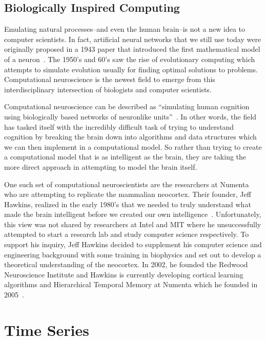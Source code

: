 \documentclass[oneside,12pt,openany]{book}
\begin{document}
	\section{Biologically Inspired Computing}
	
	Emulating natural processes--and even the human brain--is not a new idea to computer scientists. In fact, artificial neural networks that we still use today were originally proposed in a 1943 paper that introduced the first mathematical model of a neuron~\cite{FundNatComp}. The 1950's and 60's saw the rise of evolutionary computing which attempts to simulate evolution usually for finding optimal solutions to problems. Computational neuroscience is the newest field to emerge from this interdisciplinary intersection of biologists and computer scientists.
	
	Computational neuroscience can be described as ``simulating human cognition using biologically based networks of neuronlike units''~\cite{Eberhart}. In other words, the field has tasked itself with the incredibly difficult task of trying to understand cognition by breaking the brain down into algorithms and data structures which we can then implement in a computational model. So rather than trying to create a computational model that is as intelligent as the brain, they are taking the more direct approach in attempting to model the brain itself.
	
	One such set of computational neuroscientists are the researchers at Numenta who are attempting to replicate the mammalian neocortex. Their founder, Jeff Hawkins, realized in the early 1980's that we needed to truly understand what made the brain intelligent before we created our own intelligence~\cite{OnIntelligence}. Unfortunately, this view was not shared by  researchers at Intel and MIT where he unsuccessfully attempted to start a research lab and study computer science respectively. To support his inquiry, Jeff Hawkins decided to supplement his computer science and engineering background with some training in biophysics and set out to develop a theoretical understanding of the neocortex. In 2002, he founded the Redwood Neuroscience Institute and Hawkins is currently developing cortical learning algorithms and Hierarchical Temporal Memory at Numenta which he founded in 2005~\cite{OnIntelligence}. 
	
	\chapter{Time Series}
	
\end{document}
